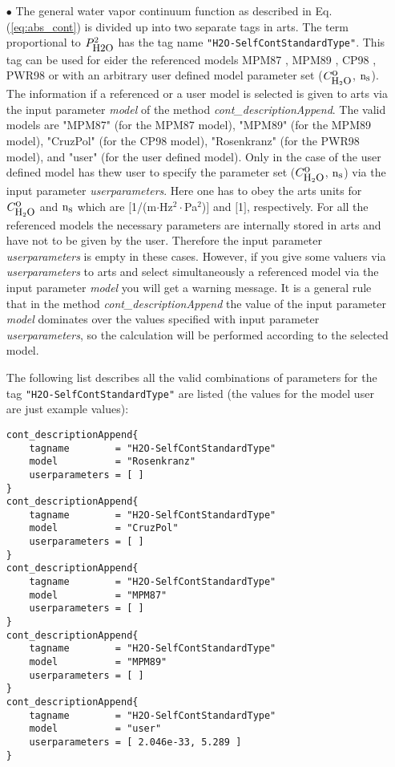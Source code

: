 \begin{itemize}
\item[$\bullet$] The general water vapor continuum function
as described in Eq. (\ref{eq:abs_cont}) is divided up into 
two separate tags in arts. The term proportional 
to $P_{\mbox{\rm \small H2O}}^2$ has the tag name {\tt "H2O-SelfContStandardType"}. 
This tag can be used for eider the referenced models 
MPM87 \citep{liebeandlayton:87}, MPM89 \citep{liebe:89}, 
CP98 \citep{cruzpol:98}, PWR98 \citep{pwr:98} or with
an arbitrary user defined model parameter set ($C^{\mbox{\rm o}}_{\mbox{\rm \small H}_{2}\mbox{\rm \small O}}$, ${\rm n}_{\mbox{\rm \small s}}$).
The information if a referenced or a user model is selected 
is given to arts via the input parameter {\it model} of the 
method {\it cont\_descriptionAppend}. The valid models are
"MPM87" (for the MPM87 model), "MPM89" (for the MPM89 model), 
"CruzPol" (for the CP98 model), "Rosenkranz" (for the PWR98 model), 
and "user"  (for the user defined model). Only in the case 
of the user defined model has thew user to specify the 
parameter set ($C^{\mbox{\rm o}}_{\mbox{\rm \small H}_{2}\mbox{\rm \small O}}$, ${\rm n}_{\mbox{\rm \small s}}$) via the input parameter 
{\it userparameters}. Here one has to obey the arts units for 
$C^{\mbox{\rm o}}_{\mbox{\rm \small H}_{2}\mbox{\rm \small O}}$ and ${\rm n}_{\mbox{\rm \small s}}$ which are $[$1/(m$\cdot$Hz$^2\cdot$Pa$^2$)$]$ and 
$[$1$]$, respectively. For all the referenced models the necessary
parameters are internally stored in arts and have not to be given by
the user. Therefore the input parameter {\it userparameters} is empty
in these cases. However, if you give some valuers via 
{\it userparameters} to arts and select simultaneously a 
referenced model via the input parameter {\it model} you will get 
a warning message. It is a general rule that in the method 
{\it cont\_descriptionAppend} the value of the input 
parameter {\it model} dominates over the values specified with 
input parameter {\it userparameters}, so the calculation will be
performed according to the selected model.

The following list describes all the valid combinations of parameters for the
tag {\tt "H2O-SelfContStandardType"} are listed (the values for the 
model user are just example values): 
\begin{lstlisting}
cont_descriptionAppend{
    tagname        = "H2O-SelfContStandardType"
    model          = "Rosenkranz"
    userparameters = [ ]
}
cont_descriptionAppend{
    tagname        = "H2O-SelfContStandardType"
    model          = "CruzPol"
    userparameters = [ ]
}
cont_descriptionAppend{
    tagname        = "H2O-SelfContStandardType"
    model          = "MPM87"
    userparameters = [ ]
}
cont_descriptionAppend{
    tagname        = "H2O-SelfContStandardType"
    model          = "MPM89"
    userparameters = [ ]
}
cont_descriptionAppend{
    tagname        = "H2O-SelfContStandardType"
    model          = "user"
    userparameters = [ 2.046e-33, 5.289 ]
}
\end{lstlisting}



\end{itemize}
